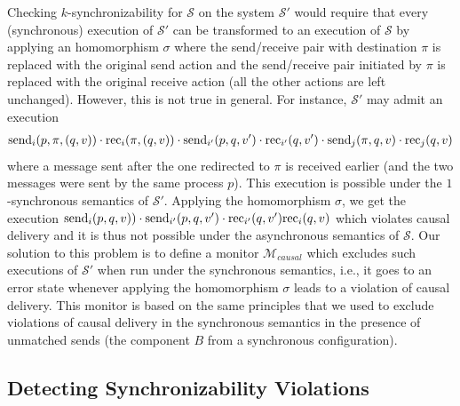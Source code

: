 Checking $k$-synchronizability for $\mathcal{S}$ on the system $\mathcal{S'}$ would require that every (synchronous) execution of $\mathcal{S'}$ can be transformed to an execution of $\mathcal{S}$ by applying an homomorphism $\sigma$ where the send/receive pair with destination $\pi$ is replaced with the original send action and the send/receive pair initiated by $\pi$ is replaced with the original receive action (all the other actions are left unchanged). However, this is not true in general. For instance, $\mathcal{S'}$ may admit an execution 
\begin{align*}
\mathrm{send}_{i}({p,\pi,(q,v)})\cdot \mathrm{rec}_{i}({\pi,(q,v)})\cdot \mathrm{send}_{i'}({p,q,v'})\cdot \mathrm{rec}_{i'}({q,v'})\cdot \mathrm{send}_{j}({\pi,q,v})\cdot \mathrm{rec}_{j}({q,v})
\end{align*}
where a message sent after the one redirected to $\pi$ is received earlier (and the two messages were sent by the same process $p$). This execution is possible under the $1$-synchronous semantics of $\mathcal{S'}$. Applying the homomorphism $\sigma$, we get the execution 
$
\mathrm{send}_{i}({p,q,v)})\cdot \mathrm{send}_{i'}({p,q,v'})\cdot \mathrm{rec}_{i'}({q,v'})\mathrm{rec}_{i}({q,v})
$
which violates causal delivery and it is thus not possible under the asynchronous semantics of $\mathcal{S}$.
Our solution to this problem is to define a monitor $\mathcal{M}_{\mathit{causal}}$ which excludes such executions of $\mathcal{S'}$ when run under the synchronous semantics, i.e., it goes to an error state whenever applying the homomorphism $\sigma$ leads to a violation of causal delivery. This monitor is based on the same principles that we used to exclude violations of causal delivery in the synchronous semantics in the presence of unmatched sends (the component $B$ from a synchronous configuration). 




\subsection{Detecting Synchronizability Violations}\label{ssec:verif4}

